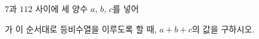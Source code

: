 $7$과 $112$ 사이에 세 양수 $a$, $b$, $c$를 넣어\par\smallskip{}\par\smallskip\noindent 가 이 순서대로 등비수열을 이루도록 할 때, $a+b+c$의 값을 구하시오.
